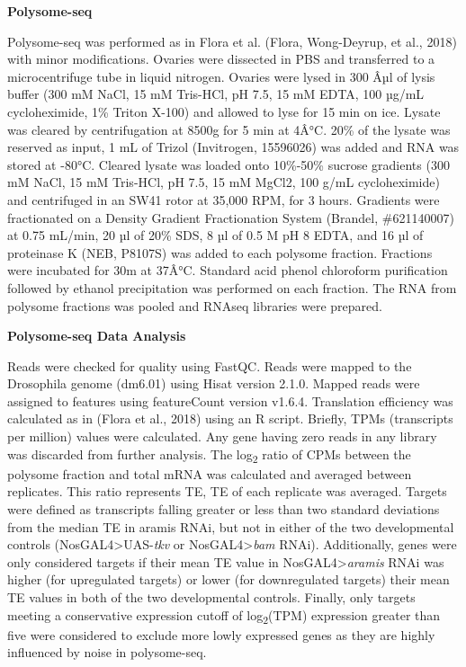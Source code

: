 \documentclass[12pt,oneside]{reedthesis}
\begin{document}
\textbf{Polysome-seq}

Polysome-seq was performed as in Flora et al. (Flora, Wong-Deyrup, et al., 2018) with
minor modifications. Ovaries were dissected in PBS and transferred to a
microcentrifuge tube in liquid nitrogen. Ovaries were lysed in 300 Âµl of
lysis buffer (300 mM NaCl, 15 mM Tris-HCl, pH 7.5, 15 mM EDTA, 100 µg/mL
cycloheximide, 1\% Triton X-100) and allowed to lyse for 15 min on ice.
Lysate was cleared by centrifugation at 8500g for 5 min at 4Â°C. 20\% of
the lysate was reserved as input, 1 mL of Trizol (Invitrogen, 15596026)
was added and RNA was stored at -80°C. Cleared lysate was loaded onto
10\%-50\% sucrose gradients (300 mM NaCl, 15 mM Tris-HCl, pH 7.5, 15 mM
MgCl2, 100 g/mL cycloheximide) and centrifuged in an SW41 rotor at
35,000 RPM, for 3 hours. Gradients were fractionated on a Density
Gradient Fractionation System (Brandel, \#621140007) at 0.75 mL/min, 20
µl of 20\% SDS, 8 µl of 0.5 M pH 8 EDTA, and 16 µl of proteinase K (NEB,
P8107S) was added to each polysome fraction. Fractions were incubated
for 30m at 37Â°C. Standard acid phenol chloroform purification followed
by ethanol precipitation was performed on each fraction. The RNA from
polysome fractions was pooled and RNAseq libraries were prepared.

\textbf{Polysome-seq Data Analysis}

Reads were checked for quality using FastQC. Reads were mapped to the
Drosophila genome (dm6.01) using Hisat version 2.1.0. Mapped reads were
assigned to features using featureCount version v1.6.4. Translation
efficiency was calculated as in (Flora et al., 2018) using an R script.
Briefly, TPMs (transcripts per million) values were calculated. Any gene
having zero reads in any library was discarded from further analysis.
The log\textsubscript{2} ratio of CPMs between the polysome fraction and total mRNA
was calculated and averaged between replicates. This ratio represents
TE, TE of each replicate was averaged. Targets were defined as
transcripts falling greater or less than two standard deviations from
the median TE in aramis RNAi, but not in either of the two developmental
controls (NosGAL4\textgreater UAS-\emph{tkv} or NosGAL4\textgreater{}\emph{bam} RNAi). Additionally,
genes were only considered targets if their mean TE value in
NosGAL4\textgreater{}\emph{aramis} RNAi was higher (for upregulated targets) or lower
(for downregulated targets) their mean TE values in both of the two
developmental controls. Finally, only targets meeting a conservative
expression cutoff of log\textsubscript{2}(TPM) expression greater than five were
considered to exclude more lowly expressed genes as they are highly
influenced by noise in polysome-seq.
\end{document}
